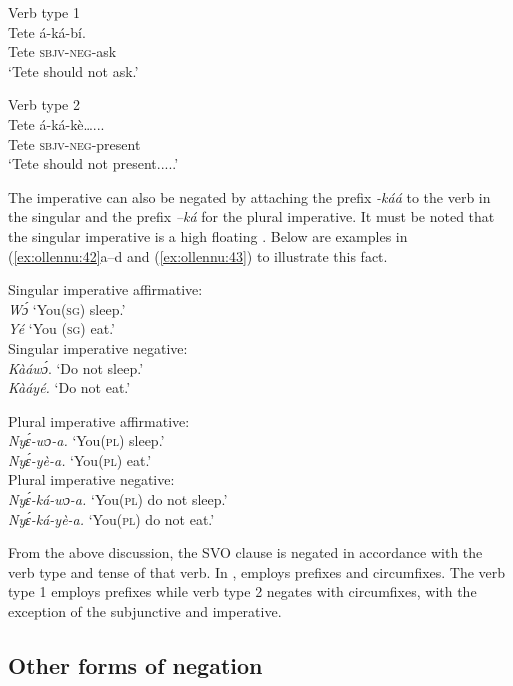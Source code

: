 \documentclass[output=paper,newtxmath,modfonts,nonflat,draftmode]{langsci/langscibook}
\begin{document}
\ea  Verb type 1 \\\label{ex:ollennu:40}
\gll Tete á-ká-bí.\\
Tete \textsc{sbjv}-\textsc{neg}-ask\\
\glt `Tete should not ask.'
\z






\ea  Verb type 2 \\\label{ex:ollennu:41}
\gll Tete á-ká-kè…...\\
Tete \textsc{sbjv}-\textsc{neg}-present\\
\glt `Tete should not present.....'
\z


The imperative can also be negated by attaching the prefix \textit{-káá} to the verb in the singular and the prefix \textit{–ká} for the plural imperative. It must be noted that the singular imperative is a high floating . Below are examples in (\ref{ex:ollennu:42}a--d and (\ref{ex:ollennu:43}) to illustrate this fact.

\ea \label{ex:ollennu:42}
Singular imperative affirmative:\\
\ea \textit{W\'ɔ}   `You(\textsc{sg}) sleep.' \\
\ex \textit{Yé}  `You (\textsc{sg}) eat.'\\
Singular imperative negative:\\
\ex \textit{Kàáw\'ɔ}.  `Do not sleep.' \\
\ex \textit{Kàáyé.}  `Do not eat.'
\z
\z

\ea \label{ex:ollennu:43} Plural imperative affirmative:\\
\ea \textit{Ny\'ɛ-wɔ-a.}  `You(\textsc{pl}) sleep.'\\
\ex  \textit{Ny\'ɛ-yè-a.}  `You(\textsc{pl}) eat.'\\
Plural imperative negative:\\
\ex \textit{Ny\'ɛ-ká-wɔ-a.}  `You(\textsc{pl}) do not sleep.' \\
\ex \textit{Ny\'ɛ-ká-yè-a.}  `You(\textsc{pl}) do not eat.'
\z
\z

From the above discussion, the SVO clause is negated in accordance with the verb type and tense of that verb. In ,  employs prefixes and circumfixes. The verb type 1 employs prefixes while verb type 2 negates with circumfixes, with the exception of the subjunctive and imperative.

\subsection{\label{sec:ollennu:2.4} Other forms of negation}
\end{document}
